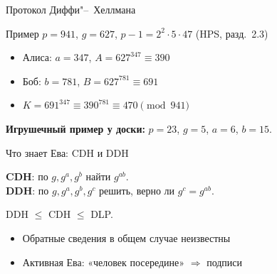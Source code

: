 \documentclass{ca-slides}
\begin{document}
\begin{canvasframe}{Протокол Диффи"--~Хеллмана}
  \centering
\end{canvasframe}

\begin{canvasframe}{Пример}
  $p = 941$, $g = 627$, $p - 1 = 2^2 \cdot 5 \cdot 47$ \hfill (HPS, разд.~2.3)
  \begin{itemize}
    \item Алиса: $a = 347$, $A = 627^{347} \equiv 390$
    \item Боб: $b = 781$, $B = 627^{781} \equiv 691$
    \item $K = 691^{347} \equiv 390^{781} \equiv 470 \pmod{941}$
  \end{itemize}
  \textbf{Игрушечный пример у доски:} $p = 23$, $g = 5$, $a = 6$, $b = 15$.
  \penspace[0.35\textheight]
\end{canvasframe}

\begin{canvasframe}{Что знает Ева: CDH и DDH}
  \begin{definition}
    \textbf{CDH}: по $g, g^a, g^b$ найти $g^{ab}$.\\
    \textbf{DDH}: по $g, g^a, g^b, g^c$ решить, верно ли $g^c = g^{ab}$.
  \end{definition}
  \begin{proposition}
    DDH $\le$ CDH $\le$ DLP.
  \end{proposition}
  \begin{itemize}
    \item Обратные сведения в общем случае неизвестны
    \item Активная Ева: «человек посередине» $\Rightarrow$ подписи
  \end{itemize}
\end{canvasframe}
\end{document}
